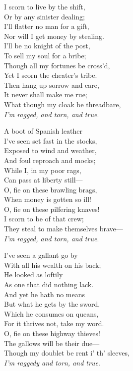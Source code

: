

\pagebreak

\settowidth{\versewidth}{Though my doublet be rent i’ th’ sleeves,}
\begin{dcverse}\begin{altverse}
I scorn to live by the shift,\\
Or by any sinister dealing;\\
I’ll flatter no man for a gift,\\
Nor will I get money by stealing.\\
I’ll be no knight of the post,\\
To sell my soul for a bribe;\\
Though all my fortunes be cross’d,\\
Yet I scorn the cheater’s tribe.\\
Then hang up sorrow and care,\\
It never shall make me rue;\\
What though my cloak be threadbare,\\
\textit{I'm ragged, and torn, and true}.
\end{altverse}

\begin{altverse}
A boot of Spanish leather\\
I’ve seen set fast in the stocks,\\
Exposed to wind and weather,\\
And foul reproach and mocks;\\
While I, in my poor rags,\\
Can pass at liberty still—\\
O, fie on these brawling brags,\\
When money is gotten so ill!\\
O, fie on these pilfering knaves!\\
I scorn to be of that crew;\\
They steal to make themselves brave—\\
\textit{I'm ragged, and torn, and true}.
\end{altverse}

\begin{altverse}
I’ve seen a gallant go by\\
With all his wealth on his back;\\
He looked as loftily\\
As one that did nothing lack.\\
And yet he hath no means\\
But what he gets by the sword,\\
Which he consumes on queans,\\
For it thrives not, take my word.\\
O, fie on these highway thieves!\\
The gallows will be their due—\\
Though my doublet be rent i’ th’ sleeves,\\
\textit{I’m raggedy and torn, and true}.
\end{altverse}


\end{dcverse}

